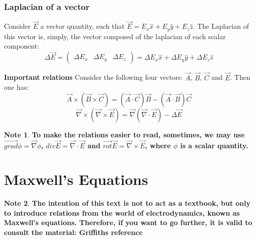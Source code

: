 \documentclass[11pt]{article}
\theoremstyle{definition}
\newtheorem{note}{Note}
\begin{document}
\subsubsection{Laplacian of a vector}
Consider $\vec{E}$ a vector quantity, such that $\vec{E} = E_{x}\hat{x}+E_{y}\hat{y}+E_{z}\hat{z}$. The Laplacian of this vector is, simply, the vector composed of the laplacian of each scalar component:
\begin{equation}
    \Delta \vec{E} = \left(\begin{matrix}
                        \Delta E_{x} & \Delta E_{y} & \Delta E_{z}
                     \end{matrix}\right) = \Delta E_{x}\hat{x} + \Delta E_{y}\hat{y} + \Delta E_{z}\hat{z}
\end{equation}
\begin{shaded}
\textbf{Important relations}\newline
Consider the following four vectors: $\vec{A}$, $\vec{B}$, $\vec{C}$ and $\vec{E}$. Then one has:
\begin{equation}
\vec{A} \times \left(\vec{B} \times \vec{C}\right) = \left(\vec{A} \cdot \vec{C}\right)\vec{B} - \left(\vec{A} \cdot \vec{B}\right)\vec{C}
\end{equation}
\begin{equation}
\vec{\nabla} \times \left(\vec{\nabla} \times \vec{E}\right) = \vec{\nabla}\left(\vec{\nabla} \cdot \vec{E}\right) - \Delta \vec{E}
\end{equation}
\begin{note}
\textbf{To make the relations easier to read, sometimes, we may use $\vec{grad} \phi = \vec{\nabla}\phi$, $div \vec{E}= \vec{\nabla} \cdot \vec{E}$ and $\vec{rot} \vec{E}= \vec{\nabla} \times \vec{E}$, where $\phi$ is a scalar quantity.}
\end{note}
\end{shaded}
\newpage
\section{Maxwell's Equations}
\begin{note}
    \textbf{The intention of this text is not to act as a textbook, but only to introduce relations from the world of electrodynamics,
    known as Maxwell's equations. Therefore, if you want to go further, it is valid to consult the material: Griffiths reference}
\end{note}
\end{document}
